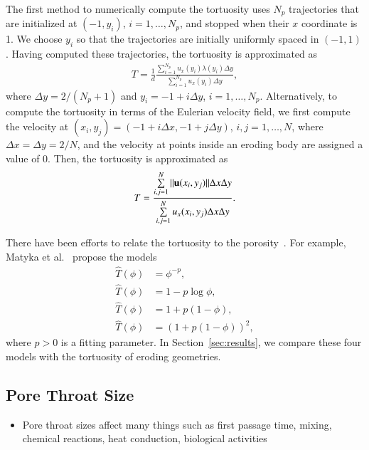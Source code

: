 \documentclass[preprint, 10pt]{elsarticle}
\begin{document}
The first method to numerically compute the tortuosity uses $N_p$
trajectories that are initialized at $(-1,y_i)$, $i=1,\ldots,N_p$, and
stopped when their $x$ coordinate is 1.  We choose $y_i$ so that the
trajectories are initially uniformly spaced in $(-1,1)$.  Having
computed these trajectories, the tortuosity is approximated as
\begin{align}
  T = \frac{1}{d}\frac{\displaystyle\sum_{i=1}^{N_p} 
    u_x(y_i) \lambda(y_i) \Delta y}
  {\displaystyle\sum_{i=1}^{N_p} u_x(y_i) \Delta y}, 
\end{align}
where $\Delta y = 2/(N_p + 1)$ and $y_i = -1 + i \Delta y$,
$i=1,\ldots,N_p$.  Alternatively, to compute the tortuosity in terms of
the Eulerian velocity field, we first compute the velocity at $(x_i,y_j)
= (-1 + i\Delta x, -1 + j\Delta y)$, $i,j=1,\ldots,N$, where $\Delta x =
\Delta y = 2/N$, and the velocity at points inside an eroding body are
assigned a value of 0.  Then, the tortuosity is approximated as
\begin{align}
  T = \frac{\sum\limits_{i,j=1}^N \|{\mathbf{u}}(x_i,y_j)\|\Delta x \Delta y}
      {\sum\limits_{i,j=1}^N u_x(x_i,y_j) \Delta x \Delta y}.
\end{align}

There have been efforts to relate the tortuosity to the
porosity~\cite{matyka2008tortuosity}.  For example, Matyka et
al.~\cite{matyka2008tortuosity} propose the models
\begin{subequations}
  \label{eqn:tortuosityModels}
  \begin{align}
    \widehat{T}(\phi) &= \phi^{-p}, \\
    \widehat{T}(\phi) &= 1-p \log \phi, \\
    \widehat{T}(\phi) &= 1+p (1-\phi), \\
    \widehat{T}(\phi) &= (1+p (1-\phi))^2, 
  \end{align}
\end{subequations}
where $p>0$ is a fitting parameter.  In Section~\ref{sec:results}, we
compare these four models with the tortuosity of eroding geometries.

\subsection{Pore Throat Size}
\begin{itemize}
  \item Pore throat sizes affect many things such as first passage time,
  mixing, chemical reactions, heat conduction, biological activities
\end{itemize}
\end{document}
